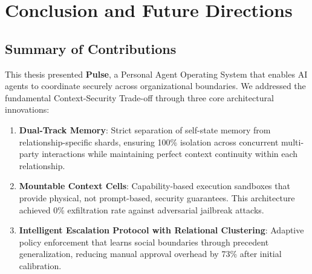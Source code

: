 \chapter{Conclusion and Future Directions}
\label{chapter:conclusion}







\section{Summary of Contributions}

This thesis presented \textbf{Pulse}, a Personal Agent Operating System that enables AI agents to coordinate securely across organizational boundaries. We addressed the fundamental Context-Security Trade-off through three core architectural innovations:

\begin{enumerate}
    \item \textbf{Dual-Track Memory}: Strict separation of self-state memory from relationship-specific shards, ensuring 100\% isolation across concurrent multi-party interactions while maintaining perfect context continuity within each relationship.

    \item \textbf{Mountable Context Cells}: Capability-based execution sandboxes that provide physical, not prompt-based, security guarantees. This architecture achieved 0\% exfiltration rate against adversarial jailbreak attacks.

    \item \textbf{Intelligent Escalation Protocol with Relational Clustering}: Adaptive policy enforcement that learns social boundaries through precedent generalization, reducing manual approval overhead by 73\% after initial calibration.
\end{enumerate}


